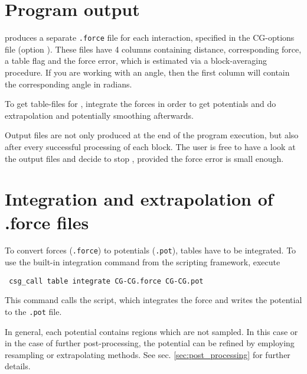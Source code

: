 \section{Program output}
 produces a separate \texttt{.force} file for each interaction, specified in the CG-options file (option ).
These files have 4 columns containing distance, corresponding force, a table flag and the force error, which is estimated via a block-averaging procedure.
If you are working with an angle, then the first column will contain the corresponding angle in radians.

To get table-files for \gromacs, integrate the forces in order to get potentials and do extrapolation and potentially smoothing afterwards.

Output files are not only produced at the end of the program execution, but also after every successful processing of each block. The user is free to have a look at the output files and decide to stop , provided the force error is small enough.

\section{Integration and extrapolation of .force files }
To convert forces (\texttt{.force}) to potentials (\texttt{.pot}), tables have to be integrated. To use the built-in integration command from the scripting framework, execute
\begin{verbatim}
 csg_call table integrate CG-CG.force CG-CG.pot
\end{verbatim}
This command calls the  script, which integrates the force and writes the potential to the \texttt{.pot} file.

In general, each potential contains regions which are not sampled. In this case or in the case of further post-processing, the potential can be refined by employing resampling or extrapolating methods. See sec. \ref{sec:post_processing} for further details.
